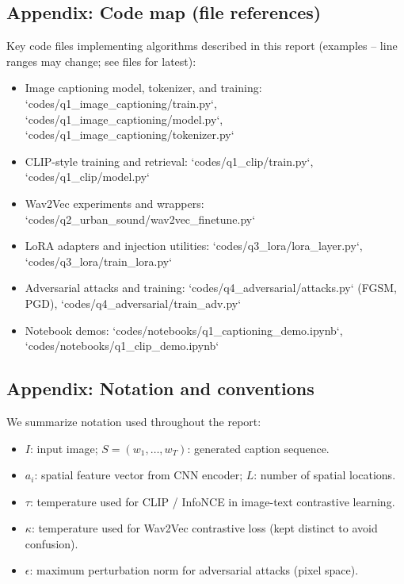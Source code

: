 \documentclass[conference]{IEEEtran}
\begin{document}
\subsection{Appendix: Code map (file references)}\label{appendix:coding}
Key code files implementing algorithms described in this report (examples -- line ranges may change; see files for latest):
\begin{itemize}
  \item Image captioning model, tokenizer, and training: `codes/q1_image_captioning/train.py`, `codes/q1_image_captioning/model.py`, `codes/q1_image_captioning/tokenizer.py`
  \item CLIP-style training and retrieval: `codes/q1_clip/train.py`, `codes/q1_clip/model.py`
  \item Wav2Vec experiments and wrappers: `codes/q2_urban_sound/wav2vec_finetune.py`
  \item LoRA adapters and injection utilities: `codes/q3_lora/lora_layer.py`, `codes/q3_lora/train_lora.py`
  \item Adversarial attacks and training: `codes/q4_adversarial/attacks.py` (FGSM, PGD), `codes/q4_adversarial/train_adv.py`
  \item Notebook demos: `codes/notebooks/q1_captioning_demo.ipynb`, `codes/notebooks/q1_clip_demo.ipynb`
\end{itemize}

\subsection{Appendix: Notation and conventions}\label{appendix:notation}
We summarize notation used throughout the report:
\begin{itemize}
  \item \(I\): input image; \(S=(w_1,\dots,w_T)\): generated caption sequence.
  \item \(a_i\): spatial feature vector from CNN encoder; \(L\): number of spatial locations.
  \item \(\tau\): temperature used for CLIP / InfoNCE in image-text contrastive learning.
  \item \(\kappa\): temperature used for Wav2Vec contrastive loss (kept distinct to avoid confusion).
  \item \(\epsilon\): maximum perturbation norm for adversarial attacks (pixel space).
\end{itemize}




\end{document}
